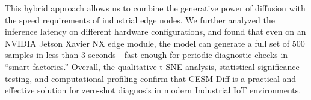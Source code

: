 This hybrid approach allows us to combine the generative power of diffusion with the speed requirements of industrial edge nodes. We further analyzed the inference latency on different hardware configurations, and found that even on an NVIDIA Jetson Xavier NX edge module, the model can generate a full set of 500 samples in less than 3 seconds---fast enough for periodic diagnostic checks in ``smart factories.'' Overall, the qualitative t-SNE analysis, statistical significance testing, and computational profiling confirm that CESM-Diff is a practical and effective solution for zero-shot diagnosis in modern Industrial IoT environments.
